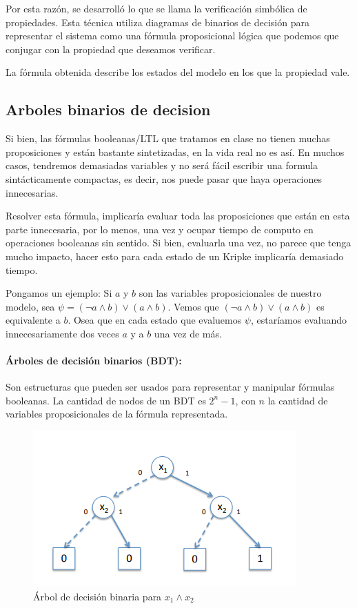Por  esta razón, se desarrolló lo que se llama la verificación simbólica de propiedades. Esta técnica utiliza diagramas de binarios de decisión para representar el sistema como una fórmula proposicional lógica que podemos que conjugar con la propiedad que deseamos verificar.

La fórmula obtenida describe los estados del modelo en los que la propiedad vale.

\subsection{Arboles binarios de decision}
Si bien, las fórmulas booleanas/LTL que tratamos en clase no tienen muchas proposiciones y están bastante sintetizadas, en la vida real no es así. En muchos casos, tendremos demasiadas variables y no será fácil escribir una formula sintácticamente compactas, es decir, nos puede pasar que haya operaciones innecesarias. 

Resolver esta fórmula, implicaría evaluar toda las proposiciones que están en esta parte innecesaria, por lo menos, una vez y ocupar tiempo de computo en operaciones booleanas sin sentido. Si bien, evaluarla una vez, no parece que tenga mucho impacto, hacer esto para cada estado de un Kripke implicaría demasiado tiempo.

Pongamos un ejemplo: Si $a$ y $b$ son las variables proposicionales de nuestro modelo, sea $\psi = (\lnot a\land b) \lor (a\land b)$. Vemos que $(\lnot a\land b) \lor (a\land b)$ es equivalente a $b$. Osea que en cada estado que evaluemos $\psi$, estaríamos evaluando innecesariamente dos veces $a$ y a $b$ una vez de más.

\paragraph{Árboles de decisión binarios (BDT):} Son estructuras que pueden ser usados para representar y manipular fórmulas booleanas. La cantidad de nodos de un BDT es $2^n-1$, con $n$ la cantidad de variables proposicionales de la fórmula representada.
\begin{figure}[h]
\centering
	\includegraphics[scale=0.5]{imagenes/binary-decision-tree}
	\caption{Árbol de decisión binaria para $x_1 \land x_2$}
\end{figure}


